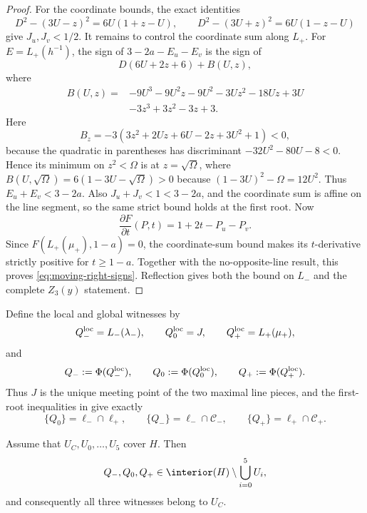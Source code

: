 \begin{proof}
For the coordinate bounds, the exact identities
\[
 D^2-(3U-z)^2=6U(1+z-U),\qquad
 D^2-(3U+z)^2=6U(1-z-U)
\]
give $J_u,J_v<1/2$.  It remains to control the coordinate sum along $L_+$.
For $E=L_+(h^{-1})$, the sign of $3-2a-E_u-E_v$ is the sign of
\[
 D(6U+2z+6)+B(U,z),
\]
where
\[
\begin{aligned}
 B(U,z)={}&-9U^3-9U^2z-9U^2-3Uz^2-18Uz+3U\\
          &-3z^3+3z^2-3z+3.
\end{aligned}
\]
Here
\[
 B_z=-3(3z^2+2Uz+6U-2z+3U^2+1)<0,
\]
because the quadratic in parentheses has discriminant
$-32U^2-80U-8<0$.  Hence its minimum on $z^2<\Omega$ is at
$z=\sqrt\Omega$, where
$B(U,\sqrt\Omega)=6(1-3U-\sqrt\Omega)>0$ because
$(1-3U)^2-\Omega=12U^2$.  Thus $E_u+E_v<3-2a$.
Also $J_u+J_v<1<3-2a$, and the coordinate sum is affine on the
line segment, so the same strict bound holds at the first root.  Now
\[
 \frac{\partial F}{\partial t}(P,t)=1+2t-P_u-P_v.
\]
Since $F(L_+(\mu_+),1-a)=0$, the coordinate-sum bound makes its $t$-derivative
strictly positive for $t\ge1-a$.  Together with the no-opposite-line result,
this proves \eqref{eq:moving-right-signs}.  Reflection gives both the bound on
$L_-$ and the complete $Z_3(y)$ statement.
\end{proof}

Define the local and global witnesses by
\begin{equation}
 Q_-^{\rm loc}=L_-(\lambda_-),\qquad
 Q_0^{\rm loc}=J,\qquad
 Q_+^{\rm loc}=L_+(\mu_+),                       \label{eq:asym-witnesses}
\end{equation}
and
\[
 Q_-:=\Phi(Q_-^{\rm loc}),
 \qquad Q_0:=\Phi(Q_0^{\rm loc}),
 \qquad Q_+:=\Phi(Q_+^{\rm loc}).
\]
Thus $J$ is the unique meeting point of the two maximal line pieces, and the
first-root inequalities in  give exactly
\[
 \{Q_0\}=\ell_-\cap\ell_+,
 \qquad
 \{Q_-\}=\ell_-\cap\mathcal C_-,
 \qquad
 \{Q_+\}=\ell_+\cap\mathcal C_+.
\]

\begin{lemma}
\label{lem:asymmetric-core-witness}
Assume that $U_C,U_0,\ldots,U_5$ cover $H$.  Then
\[
 Q_-,Q_0,Q_+
 \in\interior(H)\setminus\bigcup_{i=0}^5U_i,
\]
and consequently all three witnesses belong to $U_C$.
\end{lemma}

